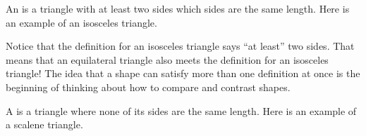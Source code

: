 \documentclass{ximera}
\begin{document}
\begin{definition}
	An  is a triangle with at least two sides which sides are the same length. Here is an example of an isosceles triangle.
	\begin{image}
	\end{image}
\end{definition}
Notice that the definition for an isosceles triangle says ``at least'' two sides. That means that an equilateral triangle also meets the definition for an isosceles triangle! The idea that a shape can satisfy more than one definition at once is the beginning of thinking about how to compare and contrast shapes.

\begin{definition}
	A  is a triangle where none of its sides are the same length. Here is an example of a scalene triangle.
	\begin{image}
	\end{image}
\end{definition}
\end{document}

